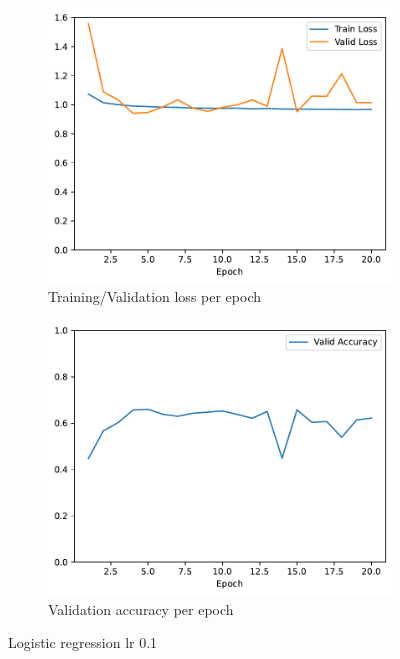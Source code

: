 \documentclass[11pt]{article}
\begin{document}
\begin{figure}
\centering
\begin{subfigure}{.5\textwidth}
  \centering
  \includegraphics[width=.9\linewidth]{plots/logistic_regression-training-loss-batch-16-lr-0.1-epochs-20-l2-0-opt-sgd}
  \caption{Training/Validation loss per epoch}
\end{subfigure}%
\begin{subfigure}{.5\textwidth}
  \centering
  \includegraphics[width=.9\linewidth]{plots/logistic_regression-validation-accuracy-batch-16-lr-0.1-epochs-20-l2-0-opt-sgd}
  \caption{Validation accuracy per epoch}
\end{subfigure}
\caption{Logistic regression lr 0.1}
\label{fig:regression_lr_0.1}
\end{figure}
\end{document}
